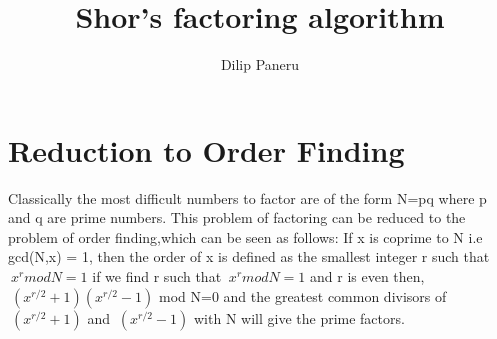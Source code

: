 \documentclass[a4,12pt]{article}
\begin{document}
\author{Dilip Paneru}
\date{}
\title{Shor's factoring algorithm}
\maketitle
\section*{Reduction to Order Finding}
 Classically the most difficult numbers to factor are of the form  N=pq where p and q are prime numbers. This problem of factoring can be reduced to the problem of order finding,which can be seen as follows: If x is coprime to N i.e gcd(N,x) = 1, then the order of x is defined as the smallest integer r such that  $\
x^r mod N =1$
if we find r such that $\ x^rmod N=1$ and r is even then, 
$\ (x^{r/2}+1)(x^{r/2}-1)$ mod N=0 
and the greatest common divisors of $\ (x^{r/2}+1)$ and  $\ (x^{r/2}-1)$ with N will give the prime factors.
\end{document}
